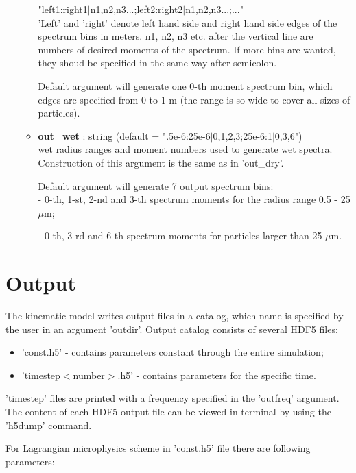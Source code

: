 \documentclass[11pt]{article}
\begin{document}
\begin{itemize}
\begin{itemize}[label=$\bullet$]
"left1:right1$|$n1,n2,n3...;left2:right2$|$n1,n2,n3...;..."\\

'Left' and 'right' denote left hand side and right hand side edges of the spectrum bins in meters. n1, n2, n3 etc. after the vertical line are numbers of desired moments of the spectrum. If more bins are wanted, they shoud be specified in the same way after semicolon.

Default argument will generate one 0-th moment spectrum bin, which edges are specified from 0 to 1 m (the range is so wide to cover all sizes of particles).

\item \textbf{out\_wet} : string (default = ".5e-6:25e-6$|$0,1,2,3;25e-6:1$|$0,3,6")\\
wet radius ranges and moment numbers used to generate wet spectra. Construction of this argument is the same as in 'out\_dry'.

Default argument will generate 7 output spectrum bins:\\
- 0-th, 1-st, 2-nd and 3-th spectrum moments for the radius range 0.5 - 25 $\mu$m;

- 0-th, 3-rd and 6-th spectrum moments for particles larger than 25 $\mu$m.

\end{itemize}



\end{itemize}

\section{Output}

The kinematic model writes output files in a catalog, which name is specified by the user in an argument 'outdir'. Output catalog consists of several HDF5 files:

\begin{itemize}
\item 'const.h5' - contains parameters constant through the entire simulation;
\item 'timestep$<$number$>$.h5' - contains parameters for the specific time.
\end{itemize}

'timestep' files are printed with a frequency specified in the 'outfreq' argument. The content of each HDF5 output file can be viewed in terminal by using the 'h5dump' command.

For Lagrangian microphysics scheme in 'const.h5' file there are following parameters:
\end{document}
